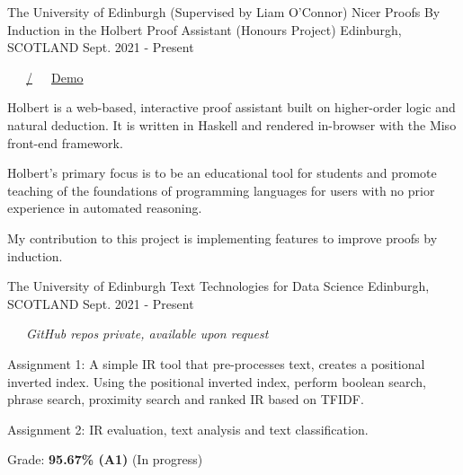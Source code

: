 \begin{cventries}
  \cventry
    {The University of Edinburgh (Supervised by Liam O'Connor)} %
    {Nicer Proofs By Induction in the Holbert Proof Assistant (Honours Project)} %
    {Edinburgh, SCOTLAND} %
    {Sept. 2021 - Present} %
    {
      \color{awesome} \color{graytext}\ \ \ \href{https://github.com/chrisjpm/holbert}{\faGithub\acvHeaderIconSep\@chrisjpm/\@holbert}\ \ \ \href{http://liamoc.net/holbert}{\faGlobe\acvHeaderIconSep\@Holbert Demo}%
      \vspace{1.6em}
      \begin{cvitems} %
        \item Holbert is a web-based, interactive proof assistant built on higher-order logic and natural deduction. It is written in Haskell and rendered in-browser with the Miso front-end framework.
        \item Holbert’s primary focus is to be an educational tool for students and promote teaching of the foundations of programming languages for users with no prior experience in automated reasoning.
        \item My contribution to this project is implementing features to improve proofs by induction.
      \end{cvitems}
    }
    
  \cventry
    {The University of Edinburgh} %
    {Text Technologies for Data Science} %
    {Edinburgh, SCOTLAND} %
    {Sept. 2021 - Present} %
    {
      \color{awesome}\color{graytext}\ \ \ \textit{GitHub repos private, available upon request}
      \vspace{1.6em}
      \begin{cvitems} %
        \item Assignment 1: A simple IR tool that pre-processes text, creates a positional inverted index. Using the positional inverted index, perform boolean search, phrase search, proximity search and ranked IR based on TFIDF.
        \item Assignment 2: IR evaluation, text analysis and text classification.
        \item Grade: \textbf{95.67\% (A1)} (In progress)
      \end{cvitems}
    }
    

\end{cventries}
